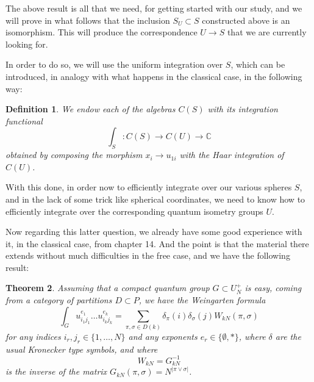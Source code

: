 \documentclass[12pt]{amsbook}
\newtheorem{theorem}{Theorem}[chapter]
\newtheorem{definition}[theorem]{Definition}
\begin{document}
The above result is all that we need, for getting started with our study, and we will prove in what follows that the inclusion $S_U\subset S$ constructed above is an isomorphism. This will produce the correspondence $U\to S$ that we are currently looking for.

\bigskip

In order to do so, we will use the uniform integration over $S$, which can be introduced, in analogy with what happens in the classical case, in the following way:

\begin{definition}
We endow each of the algebras $C(S)$ with its integration functional
$$\int_S:C(S)\to C(U)\to\mathbb C$$
obtained by composing the morphism $x_i\to u_{1i}$ with the Haar integration of $C(U)$.
\end{definition}

With this done, in order now to efficiently integrate over our various spheres $S$, and in the lack of some trick like spherical coordinates, we need to know how to efficiently integrate over the corresponding quantum isometry groups $U$. 

\bigskip

Now regarding this latter question, we already have some good experience with it, in the classical case, from chapter 14. And the point is that the material there extends without much difficulties in the free case, and we have the following result:

\begin{theorem}
Assuming that a compact quantum group $G\subset U_N^+$ is easy, coming from a category of partitions $D\subset P$, we have the Weingarten formula
$$\int_Gu_{i_1j_1}^{e_1}\ldots u_{i_kj_k}^{e_k}=\sum_{\pi,\sigma\in D(k)}\delta_\pi(i)\delta_\sigma(j)W_{kN}(\pi,\sigma)$$
for any indices $i_r,j_r\in\{1,\ldots,N\}$ and any exponents $e_r\in\{\emptyset,*\}$, where $\delta$ are the usual Kronecker type symbols, and where 
$$W_{kN}=G_{kN}^{-1}$$
is the inverse of the matrix $G_{kN}(\pi,\sigma)=N^{|\pi\vee\sigma|}$.
\end{theorem}
\end{document}
